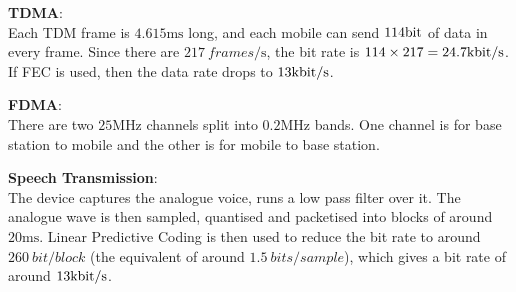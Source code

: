 \begin{description}
  \item \textbf{TDMA}:\\
    Each TDM frame is $4.615\si{\milli\second}$ long, and each mobile can send
    $114\si{\bit}$ of data in every frame. Since there are
    $217\si{~frames\per\second}$, the bit rate is
    $114 \times 217 = 24.7\si{\kilo\bit\per\second}$. If FEC is used, then the
    data rate drops to $13\si{\kilo\bit\per\second}$.

  \item \textbf{FDMA}:\\
    There are two $25\si{\mega\hertz}$ channels split into $0.2\si{\mega\hertz}$
    bands. One channel is for base station to mobile and the other is for mobile
    to base station.
  \item \textbf{Speech Transmission}:\\
    The device captures the analogue voice, runs a low pass filter over it.
     The
    analogue wave is then sampled, quantised and packetised into blocks of
    around $20\si{\milli\second}$. Linear Predictive Coding is then used to
    reduce the bit rate to around $260\si{~bit\per block}$ (the equivalent of
    around $1.5\si{~bits\per sample}$), which gives a bit rate of around
    $13\si{\kilo\bit\per\second}$.


\end{description}
